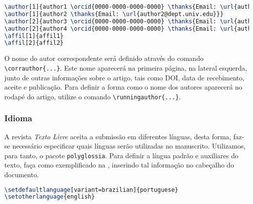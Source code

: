 \documentclass{textolivre}
\begin{document}
\begin{lstlisting}[language=tex, label=lst-authors, caption={Definição dos autores do manuscrito.},postbreak=\mbox{$\hookrightarrow$\space}]
\author[1]{author1 \orcid{0000-0000-0000-0000} \thanks{Email: \url{author1@dept.univ.edu}}}
\author[1]{author2 \thanks{Email: \url{author2@dept.univ.edu}}}
\author[2]{author3 \orcid{0000-0000-0000-0000} \thanks{Email: \url{author3@inst.gov}}}
\author[2]{author4 \orcid{0000-0000-0000-0000} \thanks{Email: \url{author4@inst.gov}}}
\affil[1]{affil1}
\affil[2]{affil2}
\end{lstlisting} %

O nome do autor correspondente será definido através do comando \verb|\corrauthor{...}|. 
Este nome aparecerá na primeira página, na lateral esquerda, junto de outras informações sobre o artigo,
tais como DOI, data de recebimento, aceite e publicação. 
Para definir a forma como o nome dos autores aparecerá no rodapé do artigo, utilize o comando \verb|\runningauthor{...}|.

\subsubsection{Idioma}\label{sec-idioma}
A revista \emph{Texto Livre} aceita a submissão em diferentes línguas, desta forma, faz-se necessário especificar quais
línguas serão utilizadas no manuscrito. Utilizamos, para tanto, o pacote \verb|polyglossia|. Para definir
a língua padrão e auxiliares do texto, faça como exemplificado na , inserindo tal informação
no cabeçalho do documento.
\begin{lstlisting}[language=tex, label=lst-setlang, caption={Definição das línguas utilizadas no artigo.}]
\setdefaultlanguage[variant=brazilian]{portuguese}
\setotherlanguage{english}
\end{lstlisting} %
\end{document}
